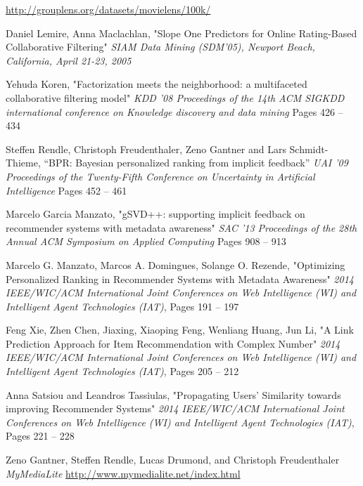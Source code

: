 \documentclass{pracamgr}
\begin{document}
    
\begin{thebibliography}{99}%
  
   \url{http://grouplens.org/datasets/movielens/100k/} %
  
   Daniel Lemire, Anna Maclachlan,
  "Slope One Predictors for Online Rating-Based Collaborative Filtering"
  \textit{SIAM Data Mining (SDM'05), Newport Beach, California, April 21-23, 2005}  
  
   Yehuda Koren,
  "Factorization meets the neighborhood: a multifaceted collaborative filtering model"
  \textit{KDD '08 Proceedings of the 14th ACM SIGKDD international conference on Knowledge discovery and data mining}
  Pages 426 -- 434 
  
   Steffen Rendle, Christoph Freudenthaler, Zeno Gantner and Lars Schmidt-Thieme,
  “BPR: Bayesian personalized ranking from implicit feedback”
  \textit{UAI '09 Proceedings of the Twenty-Fifth Conference on Uncertainty in Artificial Intelligence}
  Pages 452 -- 461
  
   Marcelo Garcia Manzato,
  "gSVD++: supporting implicit feedback on recommender systems with metadata awareness"
  \textit{SAC '13 Proceedings of the 28th Annual ACM Symposium on Applied Computing}
  Pages 908 -- 913

   Marcelo G. Manzato, Marcos A. Domingues, Solange O. Rezende,
  "Optimizing Personalized Ranking in Recommender Systems with Metadata Awareness"
  \textit{2014 IEEE/WIC/ACM International Joint Conferences on Web Intelligence (WI) and Intelligent Agent Technologies (IAT)},
  Pages 191 -- 197
  
   Feng Xie, Zhen Chen, Jiaxing, Xiaoping Feng, Wenliang Huang, Jun Li,
  "A Link Prediction Approach for Item Recommendation with Complex Number"
  \textit{2014 IEEE/WIC/ACM International Joint Conferences on Web Intelligence (WI) and Intelligent Agent Technologies (IAT)},
  Pages 205 -- 212

   Anna Satsiou and Leandros Tassiulas,
  "Propagating Users’ Similarity towards improving Recommender Systems"
  \textit{2014 IEEE/WIC/ACM International Joint Conferences on Web Intelligence (WI) and Intelligent Agent Technologies (IAT)},
  Pages 221 -- 228

   Zeno Gantner, Steffen Rendle, Lucas Drumond, and Christoph Freudenthaler
  \textit{MyMediaLite}
  \url{http://www.mymedialite.net/index.html}

\end{thebibliography}
\end{document}
